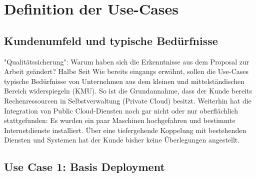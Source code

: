 \chapter{Definition der Use-Cases} \label{Umsetzung der Use-Cases und Evaluation}

\section{Kundenumfeld und typische Bedürfnisse} \label{Kundenumfeld und typische Bedürfnisse}


"Qualitätssicherung": Warum haben sich die Erkenntnisse aus dem Proposal zur Arbeit geändert? Halbe Seit
Wie bereits eingangs erwähnt, sollen die Use-Cases typische Bedürfnisse von Unternehmen aus dem kleinen und mittelständischen Bereich widerspiegeln (KMU). So ist die Grundannahme, dass der Kunde bereits Rechenressourcen in Selbstverwaltung (\glqq Private Cloud\grqq{}) besitzt. Weiterhin hat die Integration von Public Cloud-Diensten noch gar nicht oder nur oberflächlich stattgefunden: Es wurden ein paar Maschinen hochgefahren und bestimmte Internetdienste installiert. Über eine tiefergehende Koppelung mit bestehenden Diensten und Systemen hat der Kunde bisher keine Überlegungen angestellt. %


\section{Use Case 1: Basis Deployment}

